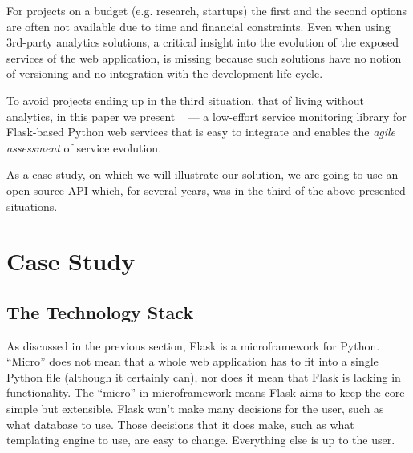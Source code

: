 
For projects on a budget (e.g. research, startups) the first and the second options are often not available due to time and financial constraints. Even when using 3rd-party analytics solutions, a critical insight into the evolution of the exposed services of the web application, is missing because such solutions have no notion of versioning and no integration with the development life cycle.~\cite{papazoglou2011managing}

To avoid projects ending up in the third situation, that of living without analytics, in this paper we present \tool~ --- a low-effort service monitoring library for Flask-based Python web services that is easy to integrate and enables the {\em agile assessment} of service evolution. \cite{Nier12b}

As a case study, on which we will illustrate our solution, we are going to use an open source API which, for several years, was in the third of the above-presented situations.





\section{Case Study}


\subsection{The Technology Stack}
\label{sec:flask}

 As discussed in the previous section, Flask is a microframework for Python. ``Micro'' does not mean that a whole web application has to fit into a single Python file (although it certainly can), nor does it mean that Flask is lacking in functionality. The ``micro'' in microframework means Flask aims to keep the core simple but extensible. Flask won’t make many decisions for the user, such as what database to use. Those decisions that it does make, such as what templating engine to use, are easy to change. Everything else is up to the user.

